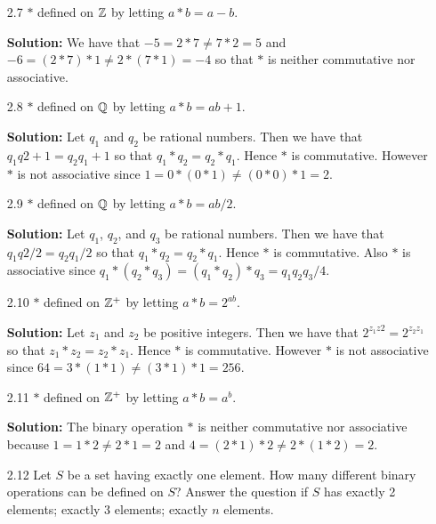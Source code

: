 \begin{enumerate}
   \item[2.7] $*$ defined on $\mathbb{Z}$ by letting $a * b = a - b$.

      \textbf{Solution:} We have that $- 5 = 2 * 7 \neq 7 * 2 = 5$ and
      $-6 = (2 * 7) * 1 \neq 2 * (7 * 1) = -4$ so that $*$ is neither 
      commutative nor associative.
   \item[2.8] $*$ defined on $\mathbb{Q}$ by letting $a * b = ab + 1$.

      \textbf{Solution:} Let $q_1$ and $q_2$ be rational numbers. Then we have
      that $q_1q2 + 1 = q_2q_1 + 1$ so that $q_1 * q_2 = q_2 * q_1$. Hence $*$
      is commutative. However $*$ is not associative since
      $1 = 0 * (0 * 1) \neq (0 * 0) * 1 = 2$.
   \item[2.9] $*$ defined on $\mathbb{Q}$ by letting $a * b = ab/2$.

      \textbf{Solution:} Let $q_1$, $q_2$, and $q_3$ be rational numbers. Then 
      we have that $q_1q2/2 = q_2q_1/2$ so that $q_1 * q_2 = q_2 * q_1$. Hence 
      $*$ is commutative. Also $*$ is associative since
      $q_1 * (q_2 * q_3) = (q_1 * q_2) * q_3 = q_1q_2q_3/4$.
   \item[2.10] $*$ defined on $\mathbb{Z}^+$ by letting $a * b = 2^{ab}$.

      \textbf{Solution:} Let $z_1$ and $z_2$ be positive integers. Then we have
      that $2^{z_1z2} = 2^{z_2z_1}$ so that $z_1 * z_2 = z_2 * z_1$. Hence $*$
      is commutative. However $*$ is not associative since
      $64 = 3 * (1 * 1) \neq (3 * 1) * 1 = 256$.
   \item[2.11] $*$ defined on $\mathbb{Z}^+$ by letting $a * b = a^b$.

      \textbf{Solution:} The binary operation $*$ is neither commutative nor 
      associative because $1 = 1 * 2 \neq 2 * 1 = 2$ and
      $4 = (2 * 1) * 2 \neq 2 * (1 * 2) = 2$.
   \item[2.12] Let $S$ be a set having exactly one element. How many different
               binary operations can be defined on $S$? Answer the question if
               $S$ has exactly 2 elements; exactly 3 elements; exactly $n$ 
               elements.


\end{enumerate}

